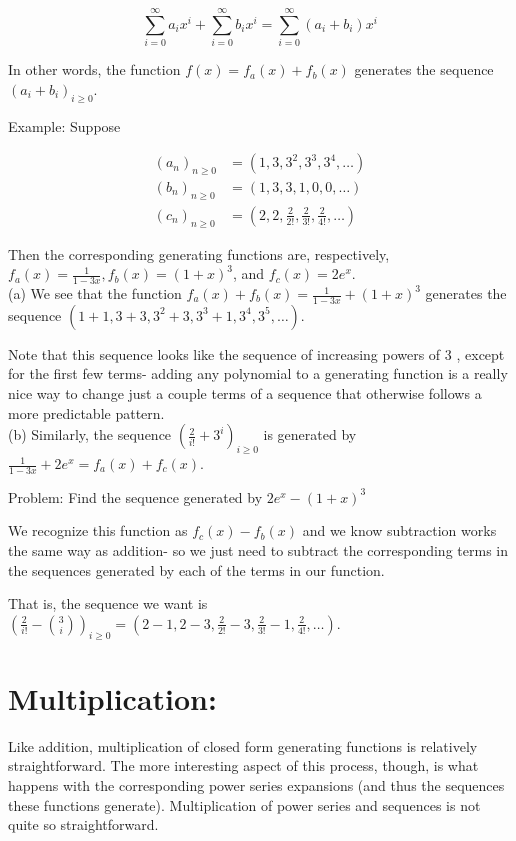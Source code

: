 \documentclass{article}
\begin{document}
$$
\sum_{i=0}^{\infty} a_{i} x^{i}+\sum_{i=0}^{\infty} b_{i} x^{i}=\sum_{i=0}^{\infty}\left(a_{i}+b_{i}\right) x^{i}
$$

In other words, the function $f(x)=f_{a}(x)+f_{b}(x)$ generates the sequence $\left(a_{i}+b_{i}\right)_{i \geq 0}$.

Example: Suppose

$$
\begin{aligned}
\left(a_{n}\right)_{n \geq 0} & =\left(1,3,3^{2}, 3^{3}, 3^{4}, \ldots\right) \\
\left(b_{n}\right)_{n \geq 0} & =(1,3,3,1,0,0, \ldots) \\
\left(c_{n}\right)_{n \geq 0} & =\left(2,2, \frac{2}{2!}, \frac{2}{3!}, \frac{2}{4!}, \ldots\right)
\end{aligned}
$$

Then the corresponding generating functions are, respectively, $f_{a}(x)=\frac{1}{1-3 x}, f_{b}(x)=(1+x)^{3}$, and $f_{c}(x)=2 e^{x}$.\\
(a) We see that the function $f_{a}(x)+f_{b}(x)=\frac{1}{1-3 x}+(1+x)^{3}$ generates the sequence $\left(1+1,3+3,3^{2}+3,3^{3}+1,3^{4}, 3^{5}, \ldots\right)$.

Note that this sequence looks like the sequence of increasing powers of 3 , except for the first few terms- adding any polynomial to a generating function is a really nice way to change just a couple terms of a sequence that otherwise follows a more predictable pattern.\\
(b) Similarly, the sequence $\left(\frac{2}{i!}+3^{i}\right)_{i \geq 0}$ is generated by $\frac{1}{1-3 x}+2 e^{x}=f_{a}(x)+f_{c}(x)$.

Problem: Find the sequence generated by $2 e^{x}-(1+x)^{3}$

We recognize this function as $f_{c}(x)-f_{b}(x)$ and we know subtraction works the same way as addition- so we just need to subtract the corresponding terms in the sequences generated by each of the terms in our function.

That is, the sequence we want is $\left(\frac{2}{i!}-\binom{3}{i}\right)_{i \geq 0}=\left(2-1,2-3, \frac{2}{2!}-3, \frac{2}{3!}-1, \frac{2}{4!}, \ldots\right)$.

\section*{Multiplication:}
Like addition, multiplication of closed form generating functions is relatively straightforward. The more interesting aspect of this process, though, is what happens with the corresponding power series expansions (and thus the sequences these functions generate). Multiplication of power series and sequences is not quite so straightforward.
\end{document}
